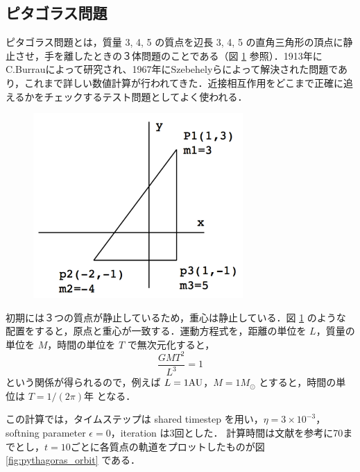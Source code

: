 \documentclass[11pt,a4paper,oneside,onecolumn]{jreport}
\begin{document}
\subsection{ピタゴラス問題}
ピタゴラス問題とは，質量 3, 4, 5 の質点を辺長 3, 4, 5 の直角三角形の頂点に静止させ，手を離したときの３体問題のことである（図 \ref{fig:pythagoras} 参照）．1913年にC.Burrauによって研究され、1967年にSzebehelyらによって解決された問題であり，これまで詳しい数値計算が行われてきた．近接相互作用をどこまで正確に追えるかをチェックするテスト問題としてよく使われる．

\begin{figure}[H]
\centering
\includegraphics[width=8cm]{./image/pythagoras_1.pdf}
\caption{\label{fig:pythagoras}}
\end{figure}

初期には３つの質点が静止しているため，重心は静止している．図 \ref{fig:pythagoras} のような配置をすると，原点と重心が一致する．運動方程式を，距離の単位を $L$，質量の単位を $M$，時間の単位を $T$ で無次元化すると，
\begin{equation}
\frac{G M T^2}{L^3} = 1
\end{equation}
という関係が得られるので，例えば $L = 1 {\rm AU}$，$M = 1 M_{\odot}$ とすると，時間の単位は $T = 1/(2 \pi) 年$ となる．

この計算では，タイムステップは shared timestep を用い，$\eta = 3 \times 10^{-3}$，softning parameter $\epsilon = 0$，iteration は3回とした． 計算時間は文献を参考に70までとし，$t = 10$ごとに各質点の軌道をプロットしたものが図 \ref{fig:pythagoras_orbit} である．
\end{document}
